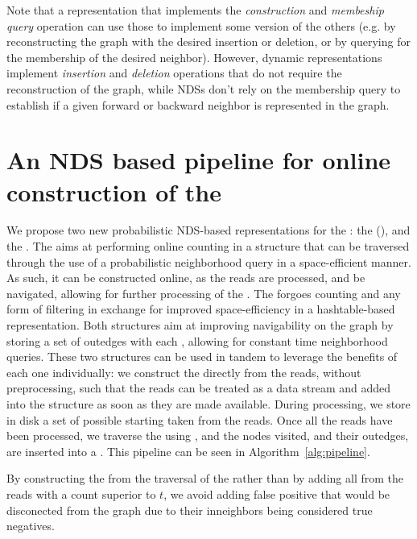 Note that a representation that implements the \emph{construction} and \emph{membeship query} operation can use those to implement some version of the others (e.g. by reconstructing the graph with the desired insertion or deletion, or by querying for the membership of the desired neighbor). However, dynamic representations implement \emph{insertion} and \emph{deletion} operations that do not require the reconstruction of the graph, while NDSs don't rely on the membership query to establish if a given forward or backward neighbor is represented in the graph. 

\section{An NDS based pipeline for online construction of the \dBG}

We propose two new probabilistic NDS-based representations for the \dBG: the \dB \cm (\dBCM), and the \dBHT. The \dBCM aims at performing online \kmer counting in a structure that can be traversed through the use of a probabilistic neighborhood query in a space-efficient manner. As such, it can be constructed online, as the reads are processed, and be navigated, allowing for further processing of the \dBG. The \dBHT forgoes \kmer counting and any form of filtering in exchange for improved space-efficiency in a hashtable-based representation. Both structures aim at improving navigability on the graph by storing a set of outedges with each \kmer, allowing for constant time neighborhood queries. These two structures can be used in tandem to leverage the benefits of each one individually: we construct the \dBCM directly from the reads, without preprocessing, such that the reads can be treated as a data stream and added into the structure as soon as they are made available. During processing, we store in disk a set of possible starting   taken from the reads. Once all the reads have been processed, we traverse the \dBCM using , and the nodes visited, and their outedges, are inserted into a \dBHT. This pipeline can be seen in Algorithm~\ref{alg:pipeline}.

By constructing the \dBHT from the traversal of the \dBCM rather than by adding all  from the reads with a count superior to $t$, we avoid adding false positive  that would be disconected from the graph due to their inneighbors being considered true negatives.

